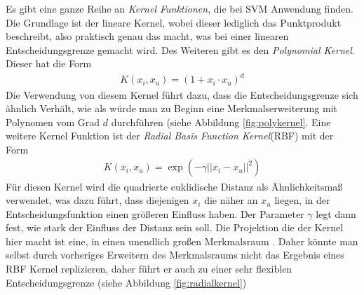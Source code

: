 \documentclass[
]{article}
\begin{document}
Es gibt eine ganze Reihe an \textit{Kernel Funktionen}, die bei SVM
Anwendung finden. Die Grundlage ist der lineare Kernel, wobei dieser
lediglich das Punktprodukt beschreibt, also praktisch genau das macht,
was bei einer linearen Entscheidungsgrenze gemacht wird. Des Weiteren
gibt es den \textit{Polynomial Kernel}. Dieser hat die Form
\begin{align}
 K(x_i,x_u)=(1+x_i\cdot x_u)^d
\end{align} Die Verwendung von diesem Kernel führt dazu, dass die
Entscheidungsgrenze sich ähnlich Verhält, wie als würde man zu Beginn
eine Merkmalserweiterung mit Polynomen vom Grad \(d\) durchführen (siehe
Abbildung \ref{fig:polykernel}. Eine weitere Kernel Funktion ist der
\textit{Radial Basis Function Kernel}(RBF) mit der Form \begin{align}
K(x_i,x_u)=\exp\left(-\gamma ||x_i-x_u||^2\right)
\end{align} Für diesen Kernel wird die quadrierte euklidische Distanz
als Ähnlichkeitsmaß verwendet, was dazu führt, dass diejenigen \(x_i\)
die näher an \(x_u\) liegen, in der Entscheidungsfunktion einen größeren
Einfluss haben. Der Parameter \(\gamma\) legt dann fest, wie stark der
Einfluss der Distanz sein soll. Die Projektion die der Kernel hier macht
ist eine, in einen unendlich großen Merkmalsraum
\parencite{jamesIntroductionStatisticalLearning2021}. Daher könnte man
selbst durch vorheriges Erweitern des Merkmalsraums nicht das Ergebnis
eines RBF Kernel replizieren, daher führt er auch zu einer sehr
flexiblen Entscheidungsgrenze (siehe Abbildung \ref{fig:radialkernel})\\
\end{document}
